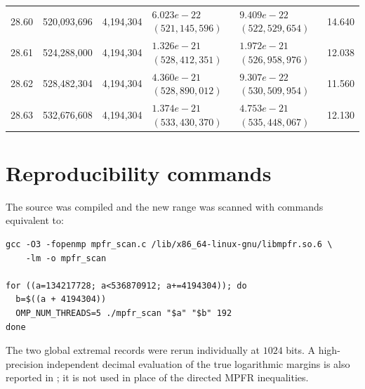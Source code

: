 \documentclass[11pt]{article}
\theoremstyle{definition}
\begin{document}
\begin{longtable}{@{}c r r >{\raggedleft\arraybackslash}p{34mm} >{\raggedleft\arraybackslash}p{34mm} r@{}}
28.60 & 520{,}093{,}696 & 4{,}194{,}304 & $6.023e-22$ $(521{,}145{,}596)$ & $9.409e-22$ $(522{,}529{,}654)$ & 14.640 \\
28.61 & 524{,}288{,}000 & 4{,}194{,}304 & $1.326e-21$ $(528{,}412{,}351)$ & $1.972e-21$ $(526{,}958{,}976)$ & 12.038 \\
28.62 & 528{,}482{,}304 & 4{,}194{,}304 & $4.360e-21$ $(528{,}890{,}012)$ & $9.307e-22$ $(530{,}509{,}954)$ & 11.560 \\
28.63 & 532{,}676{,}608 & 4{,}194{,}304 & $1.374e-21$ $(533{,}430{,}370)$ & $4.753e-21$ $(535{,}448{,}067)$ & 12.130 \\
\end{longtable}
\endgroup

\section{Reproducibility commands}

The source was compiled and the new range was scanned with commands equivalent to:

\begin{lstlisting}[style=shell]
gcc -O3 -fopenmp mpfr_scan.c /lib/x86_64-linux-gnu/libmpfr.so.6 \
    -lm -o mpfr_scan

for ((a=134217728; a<536870912; a+=4194304)); do
  b=$((a + 4194304))
  OMP_NUM_THREADS=5 ./mpfr_scan "$a" "$b" 192
done
\end{lstlisting}

The two global extremal records were rerun individually at $1024$ bits.  A high-precision
independent decimal evaluation of the true logarithmic margins is also reported in
\Cref{sec:scan}; it is not used in place of the directed MPFR inequalities.
\end{document}
